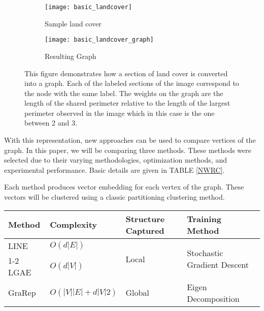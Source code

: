 \documentclass[conference]{IEEEtran}
\begin{document}
	\begin{figure}[t]
		\centering
		\begin{subfigure}[b]{.4\textwidth}
			\centering
			\texttt{[image: basic\_landcover]}
			\caption{Sample land cover}
			\label{Sample land cover}
		\end{subfigure}
		\vfill
		\begin{subfigure}[b]{.4\textwidth}
			\centering
			\texttt{[image: basic\_landcover\_graph]}
			\caption{Resulting Graph}
			\label{Resulting Graph}
		\end{subfigure}
		\caption{This figure demonstrates how a section of land cover is converted into a graph. Each of the labeled sections of the image correspond to the node with the same label. The weights on the graph are the length of the shared perimeter relative to the length of the largest perimeter observed in the image which in this case is the one between 2 and 3.}
		\label{BasicTransform}
	\end{figure}
	
	With this representation, new approaches can be used to compare vertices of the graph. In this paper, we will be comparing three methods. These methods were selected due to their varying methodologies, optimization methods, and experimental performance. Basic details are given in TABLE \ref{NWRC}.
	
	Each method produces vector embedding for each vertex of the graph. These vectors will be clustered using a classic partitioning clustering method.
	
	\renewcommand{\arraystretch}{1.2}
	\begin{table*}[t]
		\begin{tabular}{|l|l|l|l|}
			\hline
			Method & Complexity      & Structure Captured     & Training Method                              \\
			\hline
			LINE   & $O(d|E|)$         & \multirow{2}{*}{Local} & \multirow{2}{*}{Stochastic Gradient Descent} \\
			\cline{1-2}
			LGAE   & $O(d|V|)$         &                        &                                              \\
			\hline
			GraRep & $O(|V||E|+d|V|2)$ & Global                 & Eigen Decomposition \\
			\hline
		\end{tabular}
		\caption{Comparison of basic attributes of the selected network representation methods \cite{zhang2018network}\cite{SalhaGalvan2019KeepIS}}
		\label{NWRC}
	\end{table*}
	\renewcommand{\arraystretch}{1}
	
\end{document}
